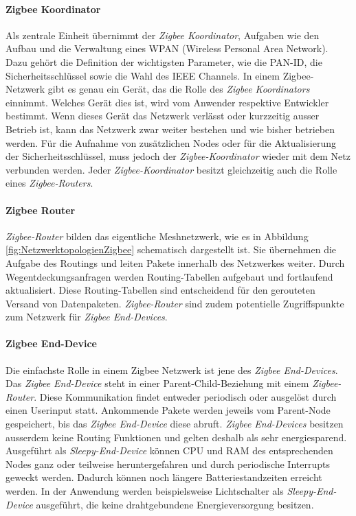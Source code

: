 \paragraph{Zigbee Koordinator}
Als zentrale Einheit übernimmt der \textit{Zigbee Koordinator}, Aufgaben wie den Aufbau und die Verwaltung eines WPAN (Wireless Personal Area Network). Dazu gehört die Definition der wichtigsten Parameter, wie die PAN-ID, die Sicherheitsschlüssel sowie die Wahl des IEEE Channels.
In einem Zigbee-Netzwerk gibt es genau ein Gerät, das die Rolle des \textit{Zigbee Koordinators} einnimmt.
Welches Gerät dies ist, wird vom Anwender respektive Entwickler bestimmt.
Wenn dieses Gerät das Netzwerk verlässt oder kurzzeitig ausser Betrieb ist, kann das Netzwerk zwar weiter bestehen und wie bisher betrieben werden. Für die Aufnahme von zusätzlichen Nodes oder für die Aktualisierung der Sicherheitsschlüssel, muss jedoch der \textit{Zigbee-Koordinator} wieder mit dem Netz verbunden werden.
Jeder \textit{Zigbee-Koordinator} besitzt gleichzeitig auch die Rolle eines \textit{Zigbee-Routers}. \cite{markus_krause_rainer_konrad_zigbee_2014}

\paragraph{Zigbee Router}
\textit{Zigbee-Router} bilden das eigentliche Meshnetzwerk, wie es in Abbildung \ref{fig:NetzwerktopologienZigbee} schematisch dargestellt ist.
Sie übernehmen die Aufgabe des Routings und leiten Pakete innerhalb des Netzwerkes weiter.
Durch Wegentdeckungsanfragen werden Routing-Tabellen aufgebaut und fortlaufend aktualisiert.
Diese Routing-Tabellen sind entscheidend für den gerouteten Versand von Datenpaketen.
\textit{Zigbee-Router} sind zudem potentielle Zugriffspunkte zum Netzwerk für \textit{Zigbee End-Devices}. \cite{markus_krause_rainer_konrad_zigbee_2014}

\paragraph{Zigbee End-Device}
Die einfachste Rolle in einem Zigbee Netzwerk ist jene des \textit{Zigbee End-Devices}. Das \textit{Zigbee End-Device} steht in einer Parent-Child-Beziehung mit einem \textit{Zigbee-Router}.
Diese Kommunikation findet entweder periodisch oder ausgelöst durch einen Userinput statt.
Ankommende Pakete werden jeweils vom Parent-Node gespeichert, bis das \textit{Zigbee End-Device} diese abruft.
\textit{Zigbee End-Devices} besitzen ausserdem keine Routing Funktionen und gelten deshalb als sehr energiesparend.
Ausgeführt als \textit{Sleepy-End-Device} können CPU und RAM des entsprechenden Nodes ganz oder teilweise heruntergefahren und durch periodische Interrupts geweckt werden.
Dadurch können noch längere Batteriestandzeiten erreicht werden.
In der Anwendung werden beispielsweise Lichtschalter als \textit{Sleepy-End-Device} ausgeführt, die keine draht­ge­bun­dene Energieversorgung besitzen. \cite{markus_krause_rainer_konrad_zigbee_2014}


